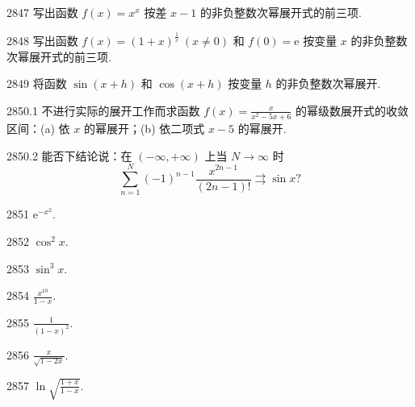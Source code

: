 \begin{prob}[S]{2847}
写出函数 $f(x) = x^x$ 按差 $x-1$ 的非负整数次幂展开式的前三项.
\end{prob}

\begin{prob}[M]{2848}
写出函数 $f(x) = (1+x)^{\frac{1}{x}} \ (x \neq 0)$ 和 $f(0) = \mathrm{e}$ 按变量 $x$ 的非负整数次幂展开式的前三项.
\end{prob}

\begin{prob}[S]{2849}
将函数 $\sin(x+h)$ 和 $\cos(x+h)$ 按变量 $h$ 的非负整数次幂展开.
\end{prob}

\begin{prob}[M]{2850.1}
不进行实际的展开工作而求函数 $f(x) = \frac{x}{x^2 - 5x + 6}$ 的幂级数展开式的收敛区间：(a) 依 $x$ 的幂展开；(b) 依二项式 $x-5$ 的幂展开.
\end{prob}

\begin{prob}[M]{2850.2}
能否下结论说：在 $(-\infty, +\infty)$ 上当 $N \to \infty$ 时
\[
\sum_{n=1}^{N} (-1)^{n-1}\frac{x^{2n-1}}{(2n-1)!} \rightrightarrows \sin x ?
\]
\end{prob}


\begin{prob}[S]{2851}
$\mathrm{e}^{-x^2}$.
\end{prob}

\begin{prob}[S]{2852}
$\cos^2 x$.
\end{prob}

\begin{prob}[S]{2853}
$\sin^3 x$.
\end{prob}

\begin{prob}[S]{2854}
$\frac{x^{10}}{1-x}$.
\end{prob}

\begin{prob}[S]{2855}
$\frac{1}{(1-x)^2}$.
\end{prob}

\begin{prob}[S]{2856}
$\frac{x}{\sqrt{1-2x}}$.
\end{prob}

\begin{prob}[S]{2857}
$\ln\sqrt{\frac{1+x}{1-x}}$.
\end{prob}

